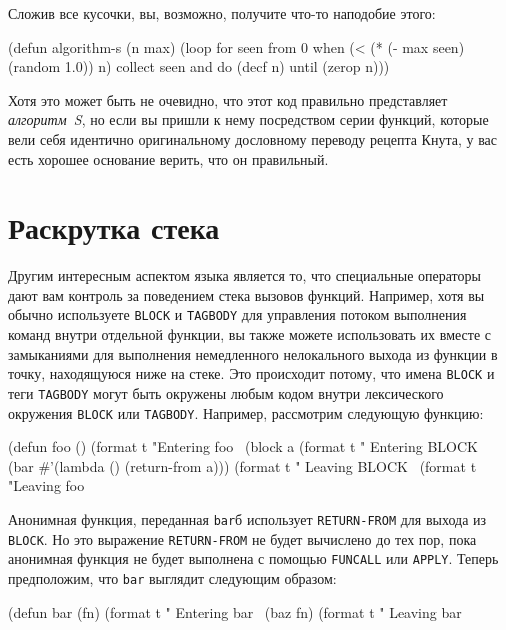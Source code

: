 Сложив все кусочки, вы, возможно, получите что-то наподобие этого:

\begin{myverb}
(defun algorithm-s (n max)
  (loop for seen from 0
     when (< (* (- max seen) (random 1.0)) n)
     collect seen and do (decf n)
     until (zerop n)))
\end{myverb}

Хотя это может быть не очевидно, что этот код правильно представляет \textit{алгоритм~S},
но если вы пришли к нему посредством серии функций, которые вели себя идентично
оригинальному дословному переводу рецепта Кнута, у вас есть хорошее основание верить, что
он правильный.

\section{Раскрутка стека}

Другим интересным аспектом языка является то, что специальные операторы дают вам контроль
за поведением стека вызовов функций. Например, хотя вы обычно используете
\lstinline{BLOCK} и \lstinline{TAGBODY} для управления потоком выполнения команд внутри
отдельной функции, вы также можете использовать их вместе с замыканиями для выполнения
немедленного нелокального выхода из функции в точку, находящуюся ниже на стеке. Это
происходит потому, что имена \lstinline{BLOCK} и теги \lstinline{TAGBODY} могут быть
окружены любым кодом внутри лексического окружения \lstinline{BLOCK} или
\lstinline{TAGBODY}.  Например, рассмотрим следующую функцию:

\begin{myverb}
(defun foo ()
  (format t "Entering foo~%
  (block a
    (format t " Entering BLOCK~%
    (bar #'(lambda () (return-from a)))
    (format t " Leaving BLOCK~%
  (format t "Leaving foo~%
\end{myverb}

Анонимная функция, переданная \lstinline{bar}б использует \lstinline{RETURN-FROM} для выхода из
\lstinline{BLOCK}. Но это выражение \lstinline{RETURN-FROM} не будет вычислено до тех пор, пока
анонимная функция не будет выполнена с помощью \lstinline{FUNCALL} или \lstinline{APPLY}. Теперь
предположим, что \lstinline{bar} выглядит следующим образом:

\begin{myverb}
(defun bar (fn)
  (format t "  Entering bar~%
  (baz fn)
  (format t "  Leaving bar~%
\end{myverb}


